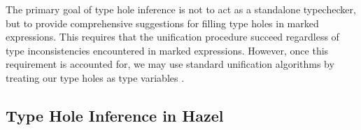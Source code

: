 The primary goal of type hole inference is not to act as a
standalone typechecker, but to provide comprehensive suggestions for filling type holes in marked
expressions. This requires that the unification procedure succeed regardless of type
inconsistencies encountered in marked expressions. However, once this requirement is accounted for,
we may use standard unification algorithms by treating our type holes as type variables
\cite{huet1976}.





\subsection{Type Hole Inference in Hazel}

